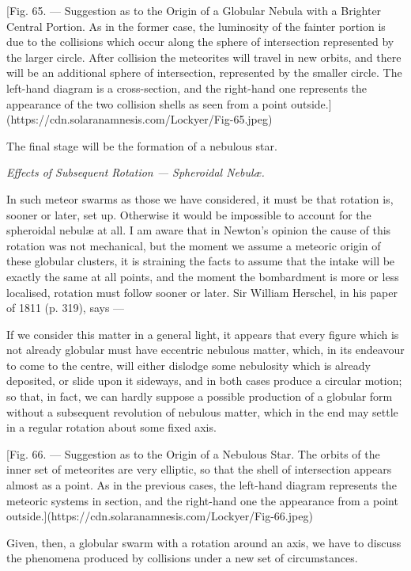 \documentclass[a4paper, 12pt, oneside, polutonikogreek, english]{article}
\begin{document}
[Fig. 65. --- Suggestion as to the Origin of a Globular Nebula with a Brighter Central Portion. As in the former case, the luminosity of the fainter portion is due to the collisions which occur along the sphere of intersection represented by the larger circle. After collision the meteorites will travel in new orbits, and there will be an additional sphere of intersection, represented by the smaller circle. The left-hand diagram is a cross-section, and the right-hand one represents the appearance of the two collision shells as seen from a point outside.](https://cdn.solaranamnesis.com/Lockyer/Fig-65.jpeg)

The final stage will be the formation of a nebulous star.

\emph{Effects of Subsequent Rotation --- Spheroidal Nebulæ.}

In such meteor swarms as those we have considered, it must be that rotation is, sooner or later, set up. Otherwise it would be impossible to account for the spheroidal nebulæ at all. I am aware that in Newton's opinion the cause of this rotation was not mechanical, but the moment we assume a meteoric origin of these globular clusters, it is straining the facts to assume that the intake will be exactly the same at all points, and the moment the bombardment is more or less localised, rotation must follow sooner or later. Sir William Herschel, in his paper of 1811 (p. 319), says ---

If we consider this matter in a general light, it appears that every figure which is not already globular must have eccentric nebulous matter, which, in its endeavour to come to the centre, will either dislodge some nebulosity which is already deposited, or slide upon it sideways, and in both cases produce a circular motion; so that, in fact, we can hardly suppose a possible production of a globular form without a subsequent revolution of nebulous matter, which in the end may settle in a regular rotation about some fixed axis.

[Fig. 66. --- Suggestion as to the Origin of a Nebulous Star. The orbits of the inner set of meteorites are very elliptic, so that the shell of intersection appears almost as a point. As in the previous cases, the left-hand diagram represents the meteoric systems in section, and the right-hand one the appearance from a point outside.](https://cdn.solaranamnesis.com/Lockyer/Fig-66.jpeg)

Given, then, a globular swarm with a rotation around an axis, we have to discuss the phenomena produced by collisions under a new set of circumstances.
\end{document}

